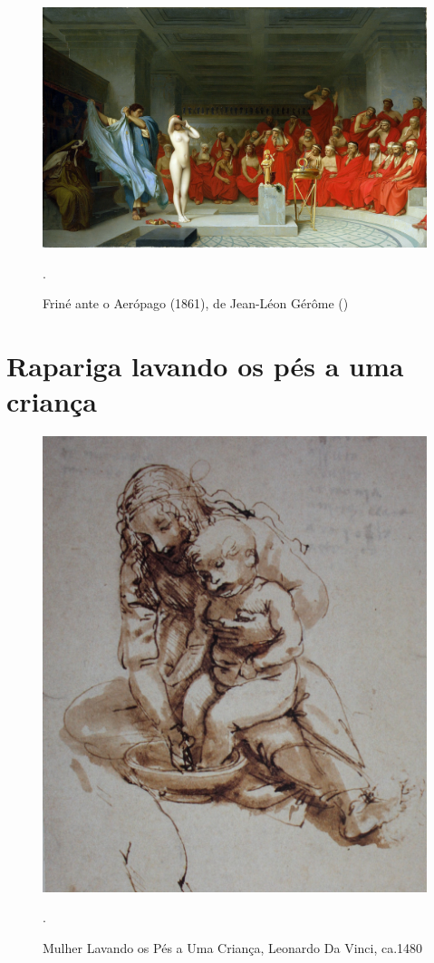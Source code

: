\documentclass{article}
\begin{document}
\begin{figure}
\centering\includegraphics[height=0.3\textheight,keepaspectratio]
                          {frine.jpg}
  \caption{Friné ante o Aerópago (1861), de Jean-Léon Gérôme (\cite{gerome})}.
  \label{fig:3}
\end{figure}

\section{Rapariga lavando os pés a uma criança}

\begin{figure}
\centering\includegraphics[height=0.3\textheight,keepaspectratio]
                          {mulher-lavando.jpg}
  \caption{Mulher Lavando os Pés a Uma Criança, Leonardo Da Vinci, ca.1480}.
  \label{fig:4}
\end{figure}
\end{document}
